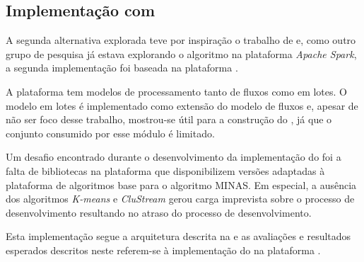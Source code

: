 \subsection{Implementação com \flink}


A segunda alternativa explorada teve por inspiração o trabalho de
 e, como outro grupo de pesquisa já estava explorando
o algoritmo na plataforma \emph{Apache Spark}, a segunda implementação
foi baseada na plataforma \flink.

A plataforma \flink tem modelos de processamento tanto de fluxos como em lotes.
O modelo em lotes é implementado como extensão do modelo de fluxos e, apesar
de não ser foco desse trabalho, mostrou-se útil para a construção do \offline,
já que o conjunto consumido por esse módulo é limitado.

Um desafio encontrado durante o desenvolvimento da implementação do \mfog foi a falta
de bibliotecas na plataforma \flink que disponibilizem versões adaptadas
à plataforma de algoritmos base para o algoritmo MINAS.
Em especial, a ausência dos algoritmos \emph{K-means} e \emph{CluStream}
gerou carga imprevista sobre o processo de desenvolvimento
resultando no atraso do processo de desenvolvimento.

Esta implementação segue a arquitetura descrita na  e as
avaliações e resultados esperados descritos neste 
referem-se à implementação do \mfog na plataforma \flink.



